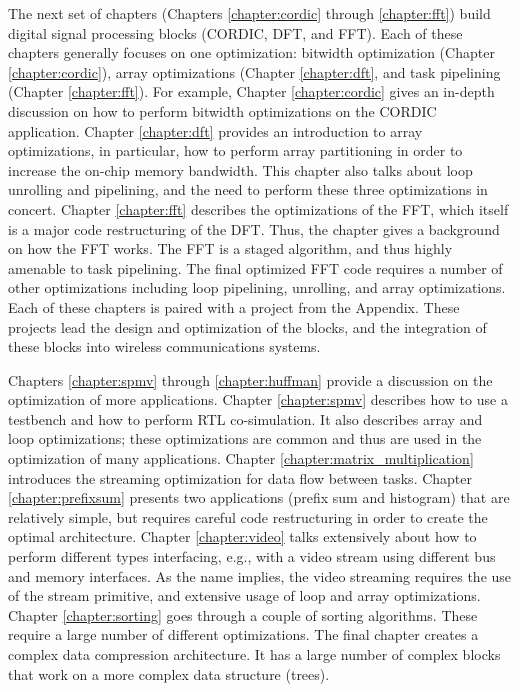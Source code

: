 The next set of chapters (Chapters \ref{chapter:cordic} through \ref{chapter:fft}) build digital signal processing blocks (CORDIC, DFT, and FFT). Each of these chapters generally focuses on one optimization: bitwidth optimization (Chapter \ref{chapter:cordic}), array optimizations (Chapter \ref{chapter:dft}, and task pipelining (Chapter \ref{chapter:fft}). For example, Chapter \ref{chapter:cordic} gives an in-depth discussion on how to perform bitwidth optimizations on the CORDIC application.  Chapter \ref{chapter:dft} provides an introduction to array optimizations, in particular, how to perform array partitioning in order to increase the on-chip memory bandwidth. This chapter also talks about loop unrolling and pipelining, and the need to perform these three optimizations in concert. Chapter \ref{chapter:fft} describes the optimizations of the FFT, which itself is a major code restructuring of the DFT. Thus, the chapter gives a background on how the FFT works. The FFT is a staged algorithm, and thus highly amenable to task pipelining. The final optimized FFT code requires a number of other optimizations including loop pipelining, unrolling, and array optimizations. Each of these chapters is paired with a project from the Appendix. These projects lead the design and optimization of the blocks, and the integration of these blocks into wireless communications systems. 

Chapters \ref{chapter:spmv} through \ref{chapter:huffman} provide a discussion on the optimization of more applications. Chapter \ref{chapter:spmv} describes how to use a testbench and how to perform RTL co-simulation. It also describes array and loop optimizations; these optimizations are common and thus are used in the optimization of many applications. Chapter \ref{chapter:matrix_multiplication} introduces the streaming optimization for data flow between tasks. Chapter \ref{chapter:prefixsum} presents two applications (prefix sum and histogram) that are relatively simple, but requires careful code restructuring in order to create the optimal architecture. Chapter \ref{chapter:video} talks extensively about how to perform different types interfacing, e.g., with a video stream using different bus and memory interfaces. As the name implies, the video streaming requires the use of the stream primitive, and extensive usage of loop and array optimizations. Chapter \ref{chapter:sorting} goes through a couple of sorting algorithms. These require a large number of different optimizations. The final chapter creates a complex data compression architecture. It has a large number of complex blocks that work on a more complex data structure (trees). 

